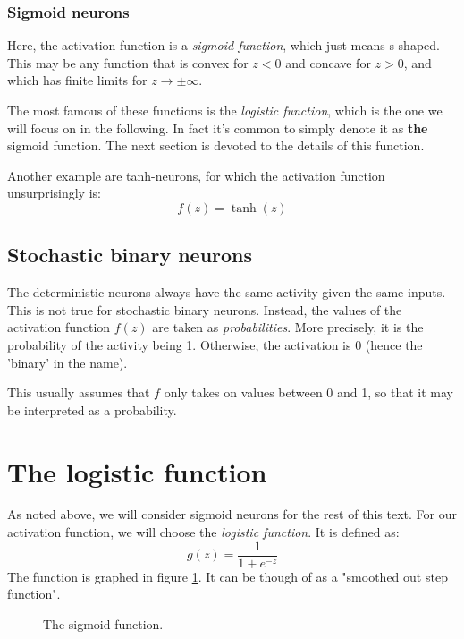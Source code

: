 \documentclass[12pt, a4paper]{article}
\numberwithin{equation}{section}
\begin{document}
\subsubsection{Sigmoid neurons}
Here, the activation function is a \textit{sigmoid function}, which just means s-shaped. This may be any function that is convex for $z<0$ and concave for $z>0$, and which has finite limits for $z\rightarrow\pm\infty$.

The most famous of these functions is the \textit{logistic function}, which is the one we will focus on in the following. In fact it's common to simply denote it as \textbf{the} sigmoid function. The next section is devoted to the details of this function.

Another example are tanh-neurons, for which the activation function unsurprisingly is:
\begin{equation}
f(z)=\tanh(z)
\end{equation} 

\subsection{Stochastic binary neurons}
The deterministic neurons always have the same activity given the same inputs. This is not true for stochastic binary neurons. Instead, the values of the activation function $f(z)$ are taken as \textit{probabilities}. More precisely, it is the probability of the activity being 1. Otherwise, the activation is 0 (hence the 'binary' in the name).

This usually assumes that $f$ only takes on values between 0 and 1, so that it may be interpreted as a probability.

\section{The logistic function}
As noted above, we will consider sigmoid neurons for the rest of this text. For our activation function, we will choose the \textit{logistic function}. It is defined as:
\begin{equation}
\label{sigmoid}
g(z)=\frac{1}{1+e^{-z}}
\end{equation}
The function is graphed in figure \ref{fig:sigmoid}. It can be though of as a "smoothed out step function".

\begin{figure}
\centering
{}
\caption{The sigmoid function.}
\label{fig:sigmoid}
\end{figure}
\end{document}
